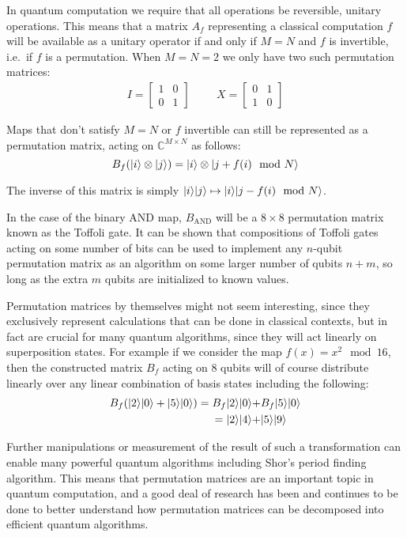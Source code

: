 In quantum computation we require that all operations be reversible, unitary operations. This means that a matrix $A_f$ representing a classical computation $f$ will be available as a unitary operator if and only if $M=N$ and $f$ is invertible, i.e.\ if $f$ is a permutation. When $M = N = 2$ we only have two such permutation matrices:
\begin{align*}
I = \left[\begin{matrix}
1&0\\
0&1
\end{matrix}\right]
&&&
X = \left[\begin{matrix}
0&1\\
1&0
\end{matrix}\right]
\end{align*}

Maps that don't satisfy $M = N$ or $f$ invertible can still be represented as a permutation matrix, acting on $\mathbb{C}^{M\times N}$ as follows:
\[B_f(| i \rangle\otimes| j \rangle) = | i \rangle\otimes| j+f(i) \mod N \rangle\]

The inverse of this matrix is simply $| i \rangle| j \rangle \mapsto | i \rangle| j-f(i) \mod N \rangle$.

In the case of the binary AND map, $B_{\text{AND}}$ will be a $8\times8$ permutation matrix known as the Toffoli gate. It can be shown that compositions of Toffoli gates acting on some number of bits can be used to implement any $n$-qubit permutation matrix as an algorithm on some larger number of qubits $n+m$, so long as the extra $m$ qubits are initialized to known values.

Permutation matrices by themselves might not seem interesting, since they exclusively represent calculations that can be done in classical contexts, but in fact are crucial for many quantum algorithms, since they will act linearly on superposition states. For example if we consider the map $f(x) = x^2\mod 16$, then the constructed matrix $B_f$ acting on 8 qubits will of course distribute linearly over any linear combination of basis states including the following:
\begin{align*}
B_f(| 2 \rangle| 0 \rangle+| 5 \rangle| 0 \rangle) 
= B_f| 2 \rangle| 0 \rangle +& B_f| 5 \rangle| 0 \rangle
\\= | 2 \rangle| 4 \rangle +& | 5 \rangle| 9 \rangle
\end{align*}

Further manipulations or measurement of the result of such a transformation can enable many powerful quantum algorithms including Shor's period finding algorithm. This means that permutation matrices are an important topic in quantum computation, and a good deal of research has been and continues to be done to better understand how permutation matrices can be decomposed into efficient quantum algorithms.

